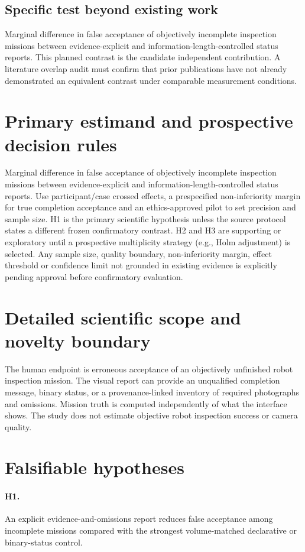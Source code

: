 \documentclass[11pt,a4paper]{article}
\begin{document}
\subsection{Specific test beyond existing work}
Marginal difference in false acceptance of objectively incomplete inspection missions between evidence-explicit and information-length-controlled status reports. This planned contrast is the candidate independent contribution. A literature overlap audit must confirm that prior publications have not already demonstrated an equivalent contrast under comparable measurement conditions.

\section{Primary estimand and prospective decision rules}
Marginal difference in false acceptance of objectively incomplete inspection missions between evidence-explicit and information-length-controlled status reports. Use participant/case crossed effects, a prespecified non-inferiority margin for true completion acceptance and an ethics-approved pilot to set precision and sample size. H1 is the primary scientific hypothesis unless the source protocol states a different frozen confirmatory contrast. H2 and H3 are supporting or exploratory until a prospective multiplicity strategy (e.g., Holm adjustment) is selected. Any sample size, quality boundary, non-inferiority margin, effect threshold or confidence limit not grounded in existing evidence is explicitly pending approval before confirmatory evaluation.

\section{Detailed scientific scope and novelty boundary}
The human endpoint is erroneous acceptance of an objectively unfinished robot inspection mission. The visual report can provide an unqualified completion message, binary status, or a provenance-linked inventory of required photographs and omissions. Mission truth is computed independently of what the interface shows. The study does not estimate objective robot inspection success or camera quality.

\section{Falsifiable hypotheses}
\paragraph{H1.} An explicit evidence-and-omissions report reduces false acceptance among incomplete missions compared with the strongest volume-matched declarative or binary-status control.
\end{document}

